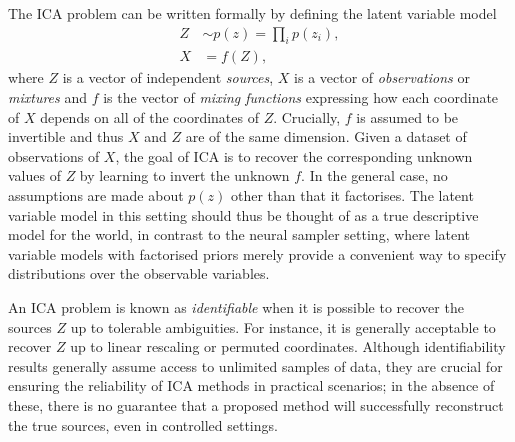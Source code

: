 The ICA problem can be written formally by defining the 
latent variable model
%
\begin{align}
Z &\sim p(z) = \prod_i p(z_i), \label{eqn:ica-basic-1} \\
X &= f(Z) \label{eqn:ica-basic-2},
\end{align}
%
where $Z$ is a vector of independent \emph{sources}, $X$ is a vector of \emph{observations} or \emph{mixtures} and $f$ is the vector of \emph{mixing functions} expressing how each coordinate of $X$ depends on all of the coordinates of $Z$. 
Crucially, $f$ is assumed to be invertible and thus $X$ and $Z$ are of the same dimension.
Given a dataset of observations of $X$, the goal of ICA is to recover the corresponding unknown values of $Z$ by learning to invert the unknown $f$.
In the general case, no assumptions are made about $p(z)$ other than that it factorises.
The latent variable model in this setting should thus be thought of as a true descriptive model for the world, 
in contrast to the neural sampler setting, where latent variable models with factorised priors merely provide a convenient way to specify distributions over the observable variables. 



An ICA problem is known as \emph{identifiable} when it is possible to recover the sources $Z$ up to tolerable ambiguities. 
For instance, it is generally acceptable to recover $Z$ up to linear rescaling or permuted coordinates.
Although identifiability results generally assume access to unlimited samples of data, they are crucial for ensuring the reliability of ICA methods in practical scenarios; in the absence of these, there is no guarantee that a proposed method will successfully reconstruct the true sources, even in controlled settings.

